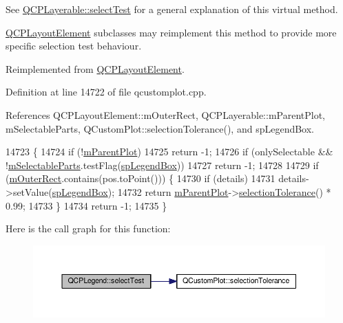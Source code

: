 See \hyperlink{class_q_c_p_layerable_a4001c4d0dfec55598efa4d531f2179a9}{Q\+C\+P\+Layerable\+::select\+Test} for a general explanation of this virtual method.

\hyperlink{class_q_c_p_layout_element}{Q\+C\+P\+Layout\+Element} subclasses may reimplement this method to provide more specific selection test behaviour. 

Reimplemented from \hyperlink{class_q_c_p_layout_element_a9fcf5d0ea19f2c23b2b528bce2c6f095}{Q\+C\+P\+Layout\+Element}.



Definition at line 14722 of file qcustomplot.\+cpp.



References Q\+C\+P\+Layout\+Element\+::m\+Outer\+Rect, Q\+C\+P\+Layerable\+::m\+Parent\+Plot, m\+Selectable\+Parts, Q\+Custom\+Plot\+::selection\+Tolerance(), and sp\+Legend\+Box.


\begin{DoxyCode}
14723                                                       \{
14724   \textcolor{keywordflow}{if} (!\hyperlink{class_q_c_p_layerable_aa2a528433e44db02b8aef23c1f9f90ed}{mParentPlot})
14725     \textcolor{keywordflow}{return} -1;
14726   \textcolor{keywordflow}{if} (onlySelectable && !\hyperlink{class_q_c_p_legend_a179b4d5c1bea723b76e402ff48f0d7fb}{mSelectableParts}.testFlag(\hyperlink{class_q_c_p_legend_a5404de8bc1e4a994ca4ae69e2c7072f1a0fa4758962a46fa1dc9da818abae23c4}{spLegendBox}))
14727     \textcolor{keywordflow}{return} -1;
14728 
14729   \textcolor{keywordflow}{if} (\hyperlink{class_q_c_p_layout_element_a07bb4973379e75cb0fa5b032c1d24afd}{mOuterRect}.contains(pos.toPoint())) \{
14730     \textcolor{keywordflow}{if} (details)
14731       details->setValue(\hyperlink{class_q_c_p_legend_a5404de8bc1e4a994ca4ae69e2c7072f1a0fa4758962a46fa1dc9da818abae23c4}{spLegendBox});
14732     \textcolor{keywordflow}{return} \hyperlink{class_q_c_p_layerable_aa2a528433e44db02b8aef23c1f9f90ed}{mParentPlot}->\hyperlink{class_q_custom_plot_a7b738074c75e80070ef6a10263c6cd69}{selectionTolerance}() * 0.99;
14733   \}
14734   \textcolor{keywordflow}{return} -1;
14735 \}
\end{DoxyCode}


Here is the call graph for this function\+:\nopagebreak
\begin{figure}[H]
\begin{center}
\leavevmode
\includegraphics[width=350pt]{class_q_c_p_legend_aa3892801051bc7b985e003576df844db_cgraph}
\end{center}
\end{figure}


